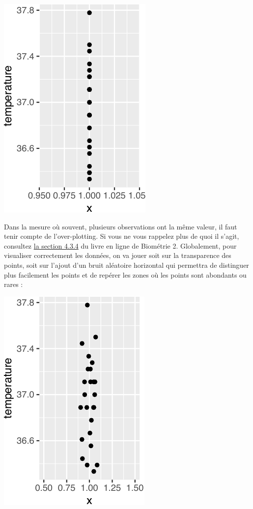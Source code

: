 \documentclass[
  a4paper,
]{article}
\newenvironment{Shaded}{\begin{snugshade}}{\end{snugshade}}
\newcommand{\DataTypeTok}[1]{\textcolor[rgb]{0.00,0.34,0.68}{#1}}
\newcommand{\DecValTok}[1]{\textcolor[rgb]{0.69,0.50,0.00}{#1}}
\newcommand{\FloatTok}[1]{\textcolor[rgb]{0.69,0.50,0.00}{#1}}
\newcommand{\KeywordTok}[1]{\textcolor[rgb]{0.12,0.11,0.11}{\textbf{#1}}}
\newcommand{\NormalTok}[1]{\textcolor[rgb]{0.12,0.11,0.11}{#1}}
\newcommand{\OperatorTok}[1]{\textcolor[rgb]{0.12,0.11,0.11}{#1}}
\newcommand{\StringTok}[1]{\textcolor[rgb]{0.75,0.01,0.01}{#1}}
\begin{document}
\begin{center}\includegraphics[width=0.25\linewidth]{figure/unnamed-chunk-15-1} \end{center}

Dans la mesure où souvent, plusieurs observations ont la même valeur, il faut tenir compte de l'over-plotting. Si vous ne vous rappelez plus de quoi il s'agit, consultez \href{https://besibo.github.io/DA/viz.html\#over-plotting}{la section 4.3.4} du livre en ligne de Biométrie 2. Globalement, pour visualiser correctement les données, on va jouer soit sur la transparence des points, soit sur l'ajout d'un bruit aléatoire horizontal qui permettra de distinguer plus facilement les points et de repérer les zones où les points sont abondants ou rares :

\begin{Shaded}
\end{Shaded}

\begin{center}\includegraphics[width=0.25\linewidth]{figure/unnamed-chunk-16-1} \end{center}
\end{document}
